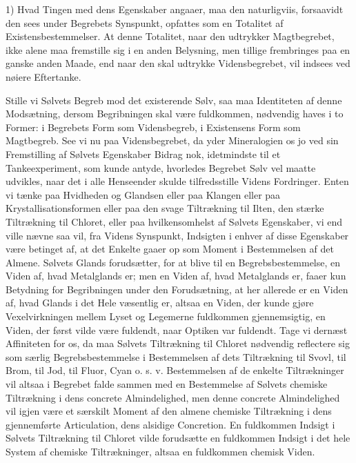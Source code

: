 \documentclass[11pt]{book}
\newcommand{\opage}[1]{\marginnote{\footnotesize\textit{[#1]}}}
\begin{document}
1) Hvad Tingen med dens Egenskaber angaaer, maa den naturligviis,
forsaavidt den sees under Begrebets Synspunkt, opfattes som en
Totalitet af Existensbestemmelser. At denne Totalitet, naar den
udtrykker Magtbegrebet, ikke alene maa fremstille sig i en anden
Belysning, men tillige frembringes paa en ganske anden Maade, end naar
den skal udtrykke Vidensbegrebet, vil indsees ved nøiere Eftertanke.

\opage{202} \setcounter{footnote}{0}%
Stille vi Sølvets Begreb mod det existerende Sølv, saa maa Identiteten
af denne Modsætning, dersom Begribningen skal være fuldkommen,
nødvendig haves i to Former: i Begrebets Form som Vidensbegreb, i
Existensens Form som Magtbegreb. See vi nu paa Vidensbegrebet, da yder
Mineralogien os jo ved sin Fremstilling af Sølvets Egenskaber Bidrag
nok, idetmindste til et Tankeexperiment, som kunde antyde, hvorledes
Begrebet Sølv vel maatte udvikles, naar det i alle Henseender skulde
tilfredsstille Videns Fordringer. Enten vi tænke paa Hvidheden og
Glandsen eller paa Klangen eller paa Krystallisationsformen eller paa
den svage Tiltrækning til Ilten, den stærke Tiltrækning til Chloret,
eller paa hvilkensomhelst af Sølvets Egenskaber, vi end ville nævne saa
vil, fra Videns Synspunkt, Indsigten i enhver af disse Egenskaber være
betinget af, at det Enkelte gaaer op som Moment i Bestemmelsen af det
Almene. Sølvets Glands forudsætter, for at blive til en
Begrebsbestemmelse, en Viden af, hvad Metalglands er; men en Viden af,
hvad Metalglands er, faaer kun Betydning for Begribningen under den
Forudsætning, at her allerede er en Viden af, hvad Glands i det Hele
væsentlig er, altsaa en Viden, der kunde gjøre Vexelvirkningen mellem
Lyset og Legemerne fuldkommen gjennemsigtig, en Viden, der først vilde
være fuldendt, naar Optiken var fuldendt. Tage vi dernæst Affiniteten
for os, da maa Sølvets Tiltrækning til Chloret nødvendig reflectere sig
som særlig Begrebsbestemmelse i Bestemmelsen af dets Tiltrækning til
Svovl, til Brom, til Jod, til Fluor, Cyan o. s. v. Bestemmelsen af de
enkelte Tiltrækninger vil altsaa i Begrebet falde sammen med en
Bestemmelse af Sølvets chemiske Tiltrækning i dens concrete
Almindelighed, men denne concrete Almindelighed vil igjen være et
særskilt Moment af den almene chemiske Tiltrækning i dens gjennemførte
Articulation, dens alsidige Concretion. En fuldkommen Indsigt i Sølvets
Tiltrækning til Chloret vilde forudsætte en fuldkommen Indsigt
\opage{203} \setcounter{footnote}{0}%
i det hele System af chemiske Tiltrækninger, altsaa en fuldkommen
chemisk Viden.
\end{document}
